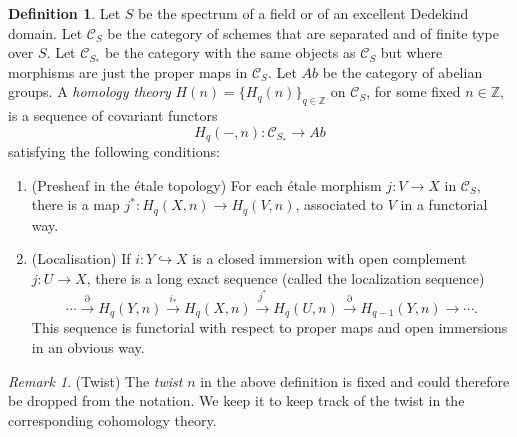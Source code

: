 \documentclass[11pt]{amsart}
\numberwithin{equation}{section}
\newtheorem{Key lemma}[theorem]{Key lemma}
\theoremstyle{definition}
\newtheorem{definition}[theorem]{Definition}
\theoremstyle{remark}
\newtheorem{remark}[theorem]{Remark}
\newcommand{\bb}{\mathbb}
\newcommand{\To}{\longrightarrow}
\newcommand{\cal}{\mathcal}
\newcommand{\xTo}[1]{\stackrel{#1}{\To}}
\begin{document}
\begin{definition}\label{definition_homology}
Let $S$ be the spectrum of a field or of an excellent Dedekind domain. Let  $\cal{C}_{S}$ be the category of schemes that are separated and of finite type over $S$. Let  $\cal{C}_{S_*}$ be the category with the same objects as $\cal{C}_{S}$ but where morphisms are just the proper maps in  $\cal{C}_{S}$. Let $Ab$ be the category of abelian groups. A \textit{homology theory} $H(n)=\{H_q(n)\}_{q\in \bb Z}$ on $\cal{C}_{S}$, for some fixed $n\in \bb Z$, is a sequence of covariant functors
$$H_q(-,n)\colon\cal{C}_{S_*}\To Ab$$
satisfying the following conditions:
\begin{enumerate}
\item (Presheaf in the \'etale topology) For each \'etale morphism $j\colon V\to X$ in $\cal{C}_{S}$, there is a map $j^*\colon H_q(X,n)\to H_q(V,n)$, associated to $V$ in a functorial way. 
\item (Localisation) If $i\colon Y\hookrightarrow X$ is a closed immersion with open complement $j\colon U\to X$, there is a long exact sequence (called the localization sequence) 
  $$\cdots\overset{\partial}\To H_q(Y,n)\xTo{i_*}
  H_q(X,n)\xTo{j^*} H_q(U,n)\xTo{\partial} H_{q-1}(Y,n)\To\cdots .$$
This sequence is functorial with respect to proper maps and open immersions in an obvious way.
\end{enumerate}
\end{definition}

\begin{remark}(Twist) The \textit{twist} $n$ in the above definition is fixed and could therefore be dropped from the notation. We keep it to keep track of the twist in the corresponding cohomology theory. \end{remark}
\end{document}
